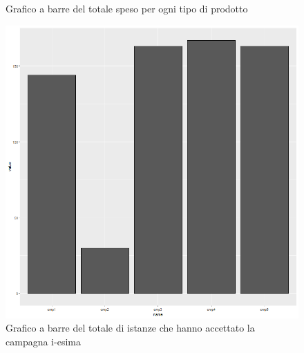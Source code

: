 \begin{frame}[fragile]
\begin{figure}[!htb]
  \caption{Grafico a barre del totale speso per ogni tipo di prodotto}\label{fig:BarPlotTs}
\endminipage\hfill
{}%
  \includegraphics[width=\linewidth]{Img/eda/EDA045.png}
  \caption{Grafico a barre del totale di istanze che hanno accettato la campagna i-esima}\label{fig:BarPlotMt}
\endminipage
\end{figure}

\end{frame}
